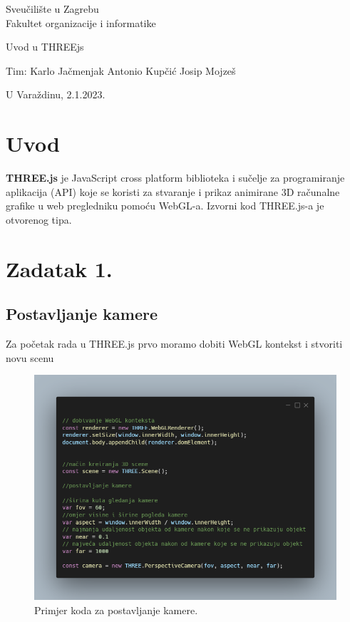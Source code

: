 \documentclass[a4paper,12pt]{article}
\begin{document}
\thispagestyle{empty}
\begin{center}
Sveučilište u Zagrebu\\
Fakultet organizacije i informatike
\end{center}
\vfill
\begin{center}
\Large Uvod u THREEjs
\end{center}
\vfill
\begin{flushright}
Tim: Karlo Jačmenjak \break
Antonio Kupčić \break
Josip Mojzeš \break
\end{flushright}
U Varaždinu, 2.1.2023. 

\newpage
\setcounter{page}{1}

\section*{Uvod}

\textbf{THREE.js} je JavaScript cross platform biblioteka i sučelje za programiranje aplikacija (API) koje se koristi za stvaranje i prikaz animirane 3D računalne grafike u web pregledniku pomoću WebGL-a. Izvorni kod THREE.js-a je otvorenog tipa.

\section*{Zadatak 1.}
\subsection{Postavljanje kamere}
\begin{flushleft}
    Za početak rada u THREE.js prvo moramo dobiti WebGL kontekst i stvoriti novu scenu 
\end{flushleft}


\begin{figure}[ht]
    \centering
    \includegraphics[scale=0.5]{image/zadatak1.png}
    \caption{Primjer koda za postavljanje kamere.}
\end{figure}
\end{document}
